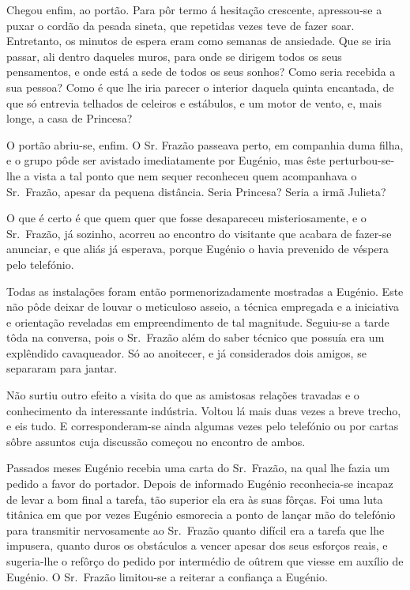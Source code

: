 \documentclass[9pt]{article}
\begin{document}
Chegou enfim, ao portão. Para pôr
termo á hesita\-ção crescente, apressou-se a puxar o cordão da pesada sineta,
que repetidas vezes teve de fazer soar.
Entretanto, os minutos de espera eram
como semanas de ansiedade. Que se iria
passar, ali dentro daqueles muros, para
onde se dirigem todos os seus pensamentos, e onde está a sede de todos os
seus sonhos? Como seria recebida a
sua pessoa? Como é que lhe iria parecer o interior daquela quinta encantada, de que só entrevia te\-lhados de celeiros e estábulos, e um motor de vento, e, mais longe, a casa de Princesa?

O portão abriu-se, enfim. O Sr.
Frazão passeava perto, em companhia
duma fi\-lha, e o grupo pôde ser avistado imediatamente por Eugé\-nio, mas êste perturbou-se-\-lhe a vista a tal ponto
que nem sequer reconheceu quem acompanhava o Sr.\ Frazão, apesar da pequena distância. Seria Princesa? Seria
a irmã Julieta?

O que é certo é que quem quer que
fosse desapareceu misteriosamente, e o
Sr.\ Frazão, já sozinho, acorreu ao encontro do visitante que acabara de fazer-se anunciar, e que aliás já esperava, porque Eugé\-nio o havia prevenido de véspera
pelo telefónio.

Todas as instala\-ções foram então
pormenorizadamente mostradas a Eugé\-nio.
Este não
pôde deixar de louvar o meticuloso asseio, a técnica empregada e a iniciativa e orienta\-ção reveladas em empreendimento de tal magnitude.
Seguiu-se a tarde tôda na conversa, pois o Sr.\ Frazão além do saber
técnico que possuía era um explêndido cavaqueador. Só ao anoitecer,
e já considerados dois amigos, se separaram para jantar.

Não surtiu outro efeito a visita do que as amistosas rela\-ções
travadas e o conhecimento da interessante indústria. Voltou lá mais
duas vezes a breve trecho, e eis tudo. E corresponderam-se ainda algumas vezes pelo telefónio ou por cartas sôbre assuntos cuja discussão começou no encontro de ambos.

Passados meses Eugé\-nio recebia uma carta do Sr.\ Frazão, na qual
\-lhe fazia um pedido a favor do portador. Depois de informado
Eugé\-nio reconhecia-se incapaz de levar a bom final a tarefa, tão superior ela era às suas fôrças. Foi uma luta titânica em que por vezes
Eugé\-nio esmorecia a ponto de lan\-çar mão do telefónio para transmitir
nervosamente ao Sr.\ Frazão quanto difícil era a tarefa que lhe impusera, quanto duros os obstáculos a vencer apesar dos seus esforços reais,
e sugeria-\-lhe o refôrço do pedido por intermédio de oûtrem que viesse
em auxílio de Eugé\-nio. O Sr.\ Frazão limitou-se a reiterar a confian\-ça
a Eugé\-nio.
\end{document}

